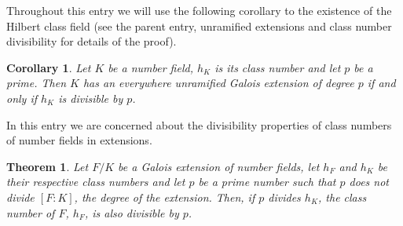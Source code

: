 \documentclass[12pt]{article}
\newtheorem{thm}{Theorem}
\newtheorem{cor}{Corollary}
\begin{document}
Throughout this entry we will use the following corollary to the existence of the Hilbert class field (see the parent entry, unramified extensions and class number divisibility for details of the proof).

\begin{cor}
Let $K$ be a number field, $h_K$ is its class number and let $p$ be a prime. Then $K$ has an everywhere unramified Galois extension of degree $p$ if and only if $h_K$ is divisible by $p$.
\end{cor}

In this entry we are concerned about the divisibility properties of class numbers of number fields in extensions. 

\begin{thm}
Let $F/K$ be a Galois extension of number fields, let $h_F$ and $h_K$ be their respective class numbers and let $p$ be a prime number such that $p$ does not divide $[F:K]$, the degree of the extension. Then, if $p$ divides $h_K$, the class number of $F$, $h_F$, is also divisible by $p$. 
\end{thm}
\end{document}
